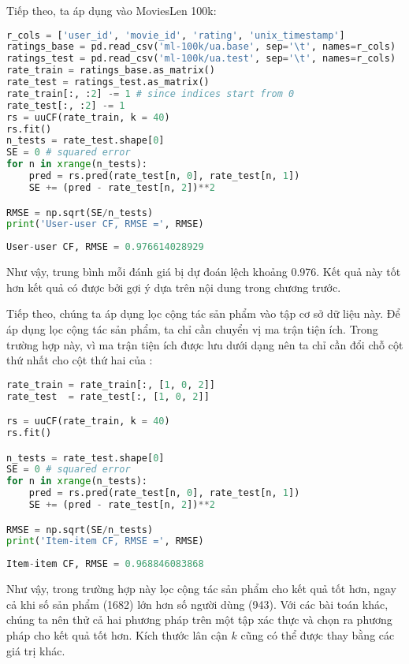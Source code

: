 Tiếp theo, ta áp dụng vào MoviesLen 100k:
\begin{lstlisting}[language=Python]
r_cols = ['user_id', 'movie_id', 'rating', 'unix_timestamp']
ratings_base = pd.read_csv('ml-100k/ua.base', sep='\t', names=r_cols)
ratings_test = pd.read_csv('ml-100k/ua.test', sep='\t', names=r_cols)
rate_train = ratings_base.as_matrix()
rate_test = ratings_test.as_matrix()
rate_train[:, :2] -= 1 # since indices start from 0
rate_test[:, :2] -= 1
rs = uuCF(rate_train, k = 40)
rs.fit()
n_tests = rate_test.shape[0]
SE = 0 # squared error
for n in xrange(n_tests):
    pred = rs.pred(rate_test[n, 0], rate_test[n, 1])
    SE += (pred - rate_test[n, 2])**2 

RMSE = np.sqrt(SE/n_tests)
print('User-user CF, RMSE =', RMSE)
\end{lstlisting}
\kq
\begin{lstlisting}[language=Python]
User-user CF, RMSE = 0.976614028929
\end{lstlisting}

Như vậy, trung bình mỗi đánh giá bị dự đoán lệch khoảng 0.976. Kết quả này tốt hơn kết quả có được bởi gợi ý dựa trên nội dung trong chương trước. 

Tiếp theo, chúng ta áp dụng lọc cộng tác sản phẩm vào tập cơ sở dữ
liệu này. Để áp dụng lọc cộng tác sản phẩm, ta chỉ cần chuyển vị ma trận tiện ích. Trong trường hợp này, vì ma trận tiện ích được lưu dưới dạng
 nên ta chỉ cần đổi chỗ cột thứ nhất
cho cột thứ hai của :

\begin{lstlisting}[language=Python]
rate_train = rate_train[:, [1, 0, 2]]
rate_test  = rate_test[:, [1, 0, 2]]

rs = uuCF(rate_train, k = 40)
rs.fit()

n_tests = rate_test.shape[0]
SE = 0 # squared error
for n in xrange(n_tests):
    pred = rs.pred(rate_test[n, 0], rate_test[n, 1])
    SE += (pred - rate_test[n, 2])**2 

RMSE = np.sqrt(SE/n_tests)
print('Item-item CF, RMSE =', RMSE)
\end{lstlisting}
\kq 
\begin{lstlisting}[language=Python]
Item-item CF, RMSE = 0.968846083868
\end{lstlisting}
Như vậy, trong trường hợp này lọc cộng tác sản phẩm cho kết quả tốt
hơn, ngay cả khi số sản phẩm (1682) lớn hơn số người dùng (943).
Với các bài toán khác, chúng ta nên thử cả hai phương pháp trên một tập xác thực và chọn
ra phương pháp cho kết quả tốt hơn. Kích thước lân cận $k$ cũng có thể được thay bằng các giá trị khác. 
 
